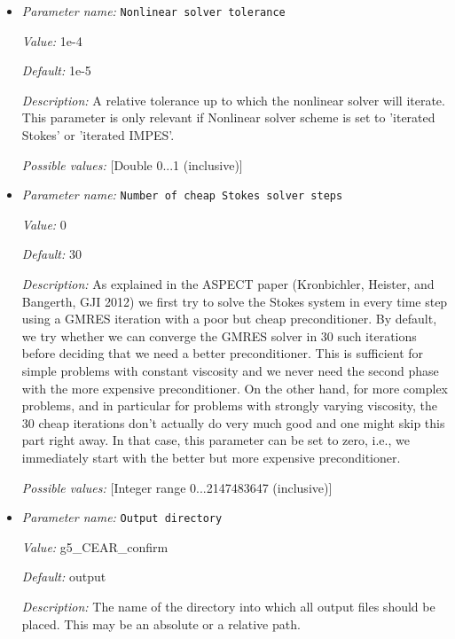 \begin{itemize}
{\it Possible values:} [Selection IMPES|iterated IMPES|iterated Stokes|Stokes only|Advection only ]
\item {\it Parameter name:} {\tt Nonlinear solver tolerance}
\label{parameters:Nonlinear solver tolerance}


{\it Value:} 1e-4


{\it Default:} 1e-5


{\it Description:} A relative tolerance up to which the nonlinear solver will iterate. This parameter is only relevant if Nonlinear solver scheme is set to 'iterated Stokes' or 'iterated IMPES'.


{\it Possible values:} [Double 0...1 (inclusive)]
\item {\it Parameter name:} {\tt Number of cheap Stokes solver steps}
\label{parameters:Number of cheap Stokes solver steps}


{\it Value:} 0


{\it Default:} 30


{\it Description:} As explained in the ASPECT paper (Kronbichler, Heister, and Bangerth, GJI 2012) we first try to solve the Stokes system in every time step using a GMRES iteration with a poor but cheap preconditioner. By default, we try whether we can converge the GMRES solver in 30 such iterations before deciding that we need a better preconditioner. This is sufficient for simple problems with constant viscosity and we never need the second phase with the more expensive preconditioner. On the other hand, for more complex problems, and in particular for problems with strongly varying viscosity, the 30 cheap iterations don't actually do very much good and one might skip this part right away. In that case, this parameter can be set to zero, i.e., we immediately start with the better but more expensive preconditioner.


{\it Possible values:} [Integer range 0...2147483647 (inclusive)]
\item {\it Parameter name:} {\tt Output directory}
\label{parameters:Output directory}


{\it Value:} g5_CEAR_confirm


{\it Default:} output


{\it Description:} The name of the directory into which all output files should be placed. This may be an absolute or a relative path.



\end{itemize}
